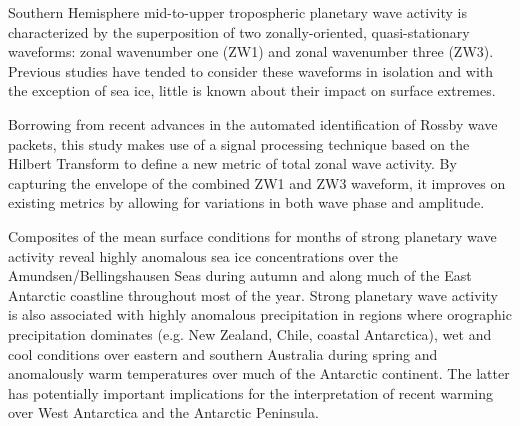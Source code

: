 Southern Hemisphere mid-to-upper tropospheric planetary wave activity is characterized by the superposition of two zonally-oriented, quasi-stationary waveforms: zonal wavenumber one (ZW1) and zonal wavenumber three (ZW3). Previous studies have tended to consider these waveforms in isolation and with the exception of sea ice, little is known about their impact on surface extremes. 

Borrowing from recent advances in the automated identification of Rossby wave packets, this study makes use of a signal processing technique based on the Hilbert Transform to define a new metric of total zonal wave activity. By capturing the envelope of the combined ZW1 and ZW3 waveform, it improves on existing metrics by allowing for variations in both wave phase and amplitude.

Composites of the mean surface conditions for months of strong planetary wave activity reveal highly anomalous sea ice concentrations over the Amundsen/Bellingshausen Seas during autumn and along much of the East Antarctic coastline throughout most of the year. Strong planetary wave activity is also associated with highly anomalous precipitation in regions where orographic precipitation dominates (e.g. New Zealand, Chile, coastal Antarctica), wet and cool conditions over eastern and southern Australia during spring and anomalously warm temperatures over much of the Antarctic continent. The latter has potentially important implications for the interpretation of recent warming over West Antarctica and the Antarctic Peninsula.
